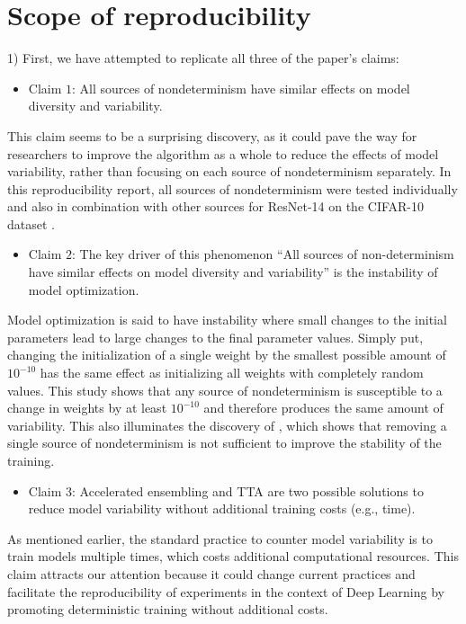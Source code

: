 \section{Scope of reproducibility}
\label{sec:Scope}
1) First, we have attempted to replicate all three of the paper's claims: 
\begin{itemize}
\item Claim $1$: All sources of nondeterminism have similar effects on model diversity and variability.
\end{itemize}
 This claim seems to be a surprising discovery, as it could pave the way for researchers to improve the algorithm as a whole to reduce the effects of model variability, rather than focusing on each source of nondeterminism separately. In this reproducibility report, all sources of nondeterminism were tested individually and also in combination with other sources for ResNet-14 \cite{he2016deep} on the CIFAR-10 dataset \cite{krizhevsky2009learning}. \begin{itemize}
 \item Claim $2$: The key driver of this phenomenon ``All sources of non-determinism have similar effects on model diversity and variability'' is the instability of model optimization.
\end{itemize}
Model optimization is said to have instability where small changes to the initial parameters lead to large changes to the final parameter values. Simply put, changing the initialization of a single weight by the smallest possible amount of $10^{-10}$ has the same effect as initializing all weights with completely random values. This study shows that any source of nondeterminism is susceptible to a change in weights by at least $10^{-10}$ and therefore produces the same amount of variability. This also illuminates the discovery of \cite{zhuang2021randomness}, which shows that removing a single source of nondeterminism is not sufficient to improve the stability of the training.
\begin{itemize}
 \item Claim $3$: Accelerated ensembling and TTA are two possible solutions to reduce model variability without additional training costs (e.g., time).
\end{itemize}
As mentioned earlier, the standard practice to counter model variability is to train models multiple times, which costs additional computational resources. This claim attracts our attention because it could change current practices and facilitate the reproducibility of experiments in the context of Deep Learning by promoting deterministic training without additional costs.
\newpage



